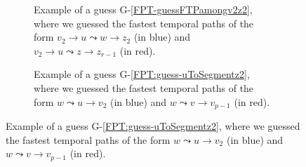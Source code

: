 \documentclass[a4paper,UKenglish,cleveref, autoref, thm-restate, anonymous]{lipics-v2021}
\begin{document}
%
\begin{figure}[t]
    \centering
	\begin{subfigure}[b]{0.48\textwidth}
		\centering
	\caption{Example of a guess G-\ref{FPT-guessFTPamongv2z2}, where we guessed the fastest temporal paths of the form $v_2 \rightarrow u \leadsto w \rightarrow z_2$ (in blue)
	and $v_2 \rightarrow u \leadsto z \rightarrow z_{r-1}$ (in red).
	\label{fig:FPT-guessG4}}
	\end{subfigure}
	\quad
	\begin{subfigure}[b]{0.48\textwidth}
		\centering
		\caption{Example of a guess G-\ref{FPT:guess-uToSegmentz2}, where we guessed the fastest temporal paths of the form $w \leadsto u \rightarrow v_2$ (in blue) and $w \leadsto v \rightarrow v_{p-1}$ (in red). 
			\label{fig:FPT-guessG5}}
	\end{subfigure}
	

\end{figure}
\end{document}
